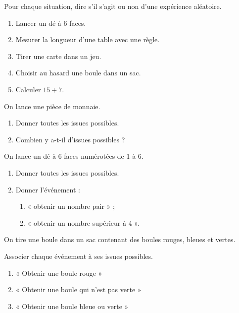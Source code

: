 \documentclass[11pt]{article}
\begin{document}
\begin{exercice}

Pour chaque situation, dire s'il s'agit ou non d'une expérience aléatoire.

\begin{enumerate}
    \item Lancer un dé à 6 faces.
    \item Mesurer la longueur d'une table avec une règle.
    \item Tirer une carte dans un jeu.
    \item Choisir au hasard une boule dans un sac.
    \item Calculer $15+7$.
\end{enumerate}

\end{exercice}


\begin{exercice}

On lance une pièce de monnaie.

\begin{enumerate}
    \item Donner toutes les issues possibles.
    \item Combien y a-t-il d'issues possibles ?
\end{enumerate}

\end{exercice}


\begin{exercice}[1][Issues d'un dé]

On lance un dé à 6 faces numérotées de 1 à 6.

\begin{enumerate}
    \item Donner toutes les issues possibles.
    \item Donner l'événement :
    \begin{enumerate}
        \item « obtenir un nombre pair » ;
        \item « obtenir un nombre supérieur à 4 ».
    \end{enumerate}
\end{enumerate}

\end{exercice}


\begin{exercice}[1][Événements]

On tire une boule dans un sac contenant des boules rouges, bleues et vertes.

Associer chaque événement à ses issues possibles.

\begin{enumerate}
    \item « Obtenir une boule rouge »
    \item « Obtenir une boule qui n'est pas verte »
    \item « Obtenir une boule bleue ou verte »
\end{enumerate}

\end{exercice}
\end{document}
